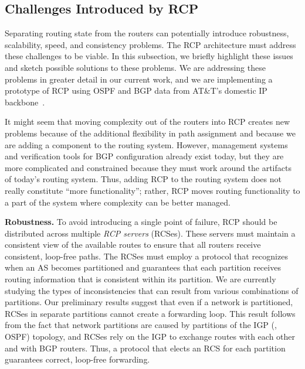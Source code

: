 \subsection{Challenges Introduced by RCP}\label{sec:weaknesses}

Separating routing state from the routers can potentially introduce
robustness, scalability, speed, and consistency problems.  The RCP
architecture must address these challenges to be viable.  In this
subsection, we briefly highlight these issues and sketch
possible solutions to these problems.  We are
addressing these problems in greater detail in our current work,
and we are implementing a prototype of RCP using OSPF and BGP
data from AT\&T's domestic IP backbone~\cite{caesar2004}.

It might seem that moving complexity out of the routers
into RCP creates new problems because of the additional flexibility
in path assignment and because we are adding a component to the routing
system.  However, management systems and verification tools
for BGP configuration already exist today, but they are more complicated
and constrained because they must work around the artifacts of today's
routing system.  Thus, adding RCP to the routing system does not
really constitute ``more functionality''; rather, RCP moves
routing functionality to a part of the system where complexity can be
better managed.



 {\bf Robustness.} To avoid introducing a single point of failure, RCP
  should be distributed across multiple {\em RCP servers} (RCSes).
  These servers must maintain a consistent view of the available routes
  to ensure that all routers receive consistent, loop-free paths.  The
  RCSes must employ a protocol that recognizes when an AS becomes
  partitioned and guarantees that each partition receives routing
  information that is consistent within its partition.  We are currently
  studying the types of inconsistencies that can result from various
  combinations of partitions.  Our preliminary results suggest that
  even if a network is partitioned, RCSes in separate partitions cannot
  create a forwarding loop.  This result follows from the fact that
  network partitions are caused by partitions of the IGP (\eg, OSPF)
  topology, and RCSes rely on the IGP to exchange routes with each other
  and with BGP routers.  Thus, a protocol that elects an RCS for
  each partition guarantees correct, loop-free forwarding.


